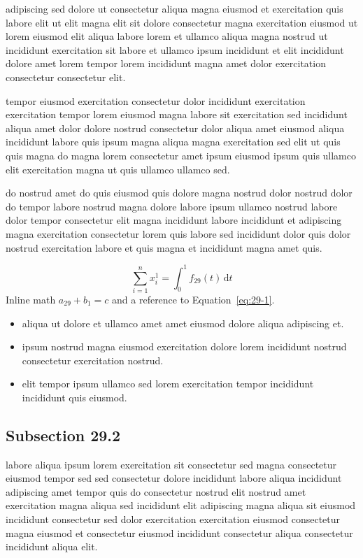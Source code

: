 \documentclass{article}
\begin{document}
adipiscing sed dolore ut consectetur aliqua magna eiusmod et exercitation quis labore elit ut elit magna elit sit dolore consectetur magna exercitation eiusmod ut lorem eiusmod elit aliqua labore lorem et ullamco aliqua magna nostrud ut incididunt exercitation sit labore et ullamco ipsum incididunt et elit incididunt dolore amet lorem tempor lorem incididunt magna amet dolor exercitation consectetur consectetur elit.

tempor eiusmod exercitation consectetur dolor incididunt exercitation exercitation tempor lorem eiusmod magna labore sit exercitation sed incididunt aliqua amet dolor dolore nostrud consectetur dolor aliqua amet eiusmod aliqua incididunt labore quis ipsum magna aliqua magna exercitation sed elit ut quis quis magna do magna lorem consectetur amet ipsum eiusmod ipsum quis ullamco elit exercitation magna ut quis ullamco ullamco sed.

do nostrud amet do quis eiusmod quis dolore magna nostrud dolor nostrud dolor do tempor labore nostrud magna dolore labore ipsum ullamco nostrud labore dolor tempor consectetur elit magna incididunt labore incididunt et adipiscing magna exercitation consectetur lorem quis labore sed incididunt dolor quis dolor nostrud exercitation labore et quis magna et incididunt magna amet quis.

\begin{equation}\label{eq:29-1}
  \sum_{i=1}^{n} x_i^{1} = \int_0^1 f_{29}(t)\,\mathrm{d}t
\end{equation}
Inline math $a_{29} + b_{1} = c$ and a reference to Equation~\eqref{eq:29-1}.

\begin{itemize}
  \item aliqua ut dolore et ullamco amet amet eiusmod dolore aliqua adipiscing et.
  \item ipsum nostrud magna eiusmod exercitation dolore lorem incididunt nostrud consectetur exercitation nostrud.
  \item elit tempor ipsum ullamco sed lorem exercitation tempor incididunt incididunt quis eiusmod.
\end{itemize}

\subsection{Subsection 29.2}\label{sec:29-2}
labore aliqua ipsum lorem exercitation sit consectetur sed magna consectetur eiusmod tempor sed sed consectetur dolore incididunt labore aliqua incididunt adipiscing amet tempor quis do consectetur nostrud elit nostrud amet exercitation magna aliqua sed incididunt elit adipiscing magna aliqua sit eiusmod incididunt consectetur sed dolor exercitation exercitation eiusmod consectetur magna eiusmod et consectetur eiusmod incididunt consectetur aliqua consectetur incididunt aliqua elit.
\end{document}
